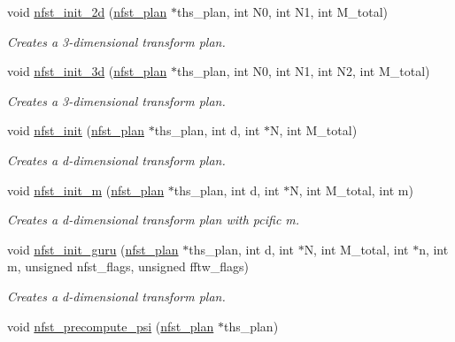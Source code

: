 \begin{CompactItemize}
void \hyperlink{group__nfsct_g44eff771382180419936a6dbf51505fa}{nfst\_\-init\_\-2d} (\hyperlink{structnfst__plan}{nfst\_\-plan} $\ast$ths\_\-plan, int N0, int N1, int M\_\-total)
\begin{CompactList}\small\item\em Creates a 3-dimensional transform plan. \item\end{CompactList}\item 
void \hyperlink{group__nfsct_gf1dd972b1831e75d3cfba0a0a2671711}{nfst\_\-init\_\-3d} (\hyperlink{structnfst__plan}{nfst\_\-plan} $\ast$ths\_\-plan, int N0, int N1, int N2, int M\_\-total)
\begin{CompactList}\small\item\em Creates a 3-dimensional transform plan. \item\end{CompactList}\item 
void \hyperlink{group__nfsct_ge4043a9926de23326b21b8722648bafa}{nfst\_\-init} (\hyperlink{structnfst__plan}{nfst\_\-plan} $\ast$ths\_\-plan, int d, int $\ast$N, int M\_\-total)
\begin{CompactList}\small\item\em Creates a d-dimensional transform plan. \item\end{CompactList}\item 
void \hyperlink{group__nfsct_g8a48a14e97780c89216d09bdb75f513a}{nfst\_\-init\_\-m} (\hyperlink{structnfst__plan}{nfst\_\-plan} $\ast$ths\_\-plan, int d, int $\ast$N, int M\_\-total, int m)
\begin{CompactList}\small\item\em Creates a d-dimensional transform plan with pcific m. \item\end{CompactList}\item 
void \hyperlink{group__nfsct_g052efac9f85424d50ceb77279c4e8cc3}{nfst\_\-init\_\-guru} (\hyperlink{structnfst__plan}{nfst\_\-plan} $\ast$ths\_\-plan, int d, int $\ast$N, int M\_\-total, int $\ast$n, int m, unsigned nfst\_\-flags, unsigned fftw\_\-flags)
\begin{CompactList}\small\item\em Creates a d-dimensional transform plan. \item\end{CompactList}\item 
void \hyperlink{group__nfsct_g0580a0aa2d426835b618b564b5ef3387}{nfst\_\-precompute\_\-psi} (\hyperlink{structnfst__plan}{nfst\_\-plan} $\ast$ths\_\-plan)

\end{CompactItemize}
